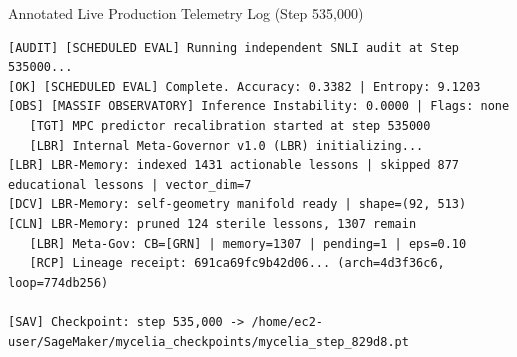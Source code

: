 \documentclass[11pt,a4paper]{article}
\begin{document}
\begin{logbox}{Annotated Live Production Telemetry Log (Step 535,000)}
\begin{Verbatim}[breaklines=true,breakanywhere=true,breaksymbolleft={},breaksymbolright={}]
[AUDIT] [SCHEDULED EVAL] Running independent SNLI audit at Step 535000...
[OK] [SCHEDULED EVAL] Complete. Accuracy: 0.3382 | Entropy: 9.1203
[OBS] [MASSIF OBSERVATORY] Inference Instability: 0.0000 | Flags: none
   [TGT] MPC predictor recalibration started at step 535000
   [LBR] Internal Meta-Governor v1.0 (LBR) initializing...
[LBR] LBR-Memory: indexed 1431 actionable lessons | skipped 877 educational lessons | vector_dim=7
[DCV] LBR-Memory: self-geometry manifold ready | shape=(92, 513)
[CLN] LBR-Memory: pruned 124 sterile lessons, 1307 remain
   [LBR] Meta-Gov: CB=[GRN] | memory=1307 | pending=1 | eps=0.10
   [RCP] Lineage receipt: 691ca69fc9b42d06... (arch=4d3f36c6, loop=774db256)

[SAV] Checkpoint: step 535,000 -> /home/ec2-user/SageMaker/mycelia_checkpoints/mycelia_step_829d8.pt
\end{Verbatim}
\end{logbox}
\end{document}
